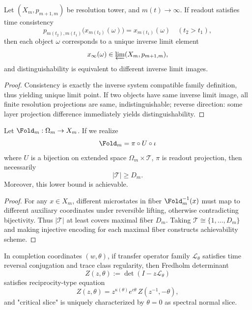 \begin{theorem}\label{thm:xi-time-consistent-inverse-limit-readout}
Let \((X_m,p_{m+1,m})\) be resolution tower, and \(m(t)\to\infty\).
If readout satisfies time consistency
\[
p_{m(t_2),m(t_1)}\bigl(x_{m(t_2)}(\omega)\bigr)=x_{m(t_1)}(\omega)\quad(t_2>t_1),
\]
then each object \(\omega\) corresponds to a unique inverse limit element
\[
x_\infty(\omega)\in \varprojlim(X_m,p_{m+1,m}),
\]
and distinguishability is equivalent to different inverse limit images.
\end{theorem}

\begin{proof}
Consistency is exactly the inverse system compatible family definition, thus yielding unique limit point.
If two objects have same inverse limit image, all finite resolution projections are same, indistinguishable;
reverse direction: some layer projection difference immediately yields distinguishability.
\end{proof}

\begin{theorem}\label{thm:xi-time-fiber-minimal-dimension}
Let \(\Fold_m:\Omega_m\to X_m\).
If we realize
\[
\Fold_m=\pi\circ U\circ\iota
\]
where \(U\) is a bijection on extended space \(\Omega_m\times\mathcal T\), \(\pi\) is readout projection, then necessarily
\[
|\mathcal T|\ge D_m.
\]
Moreover, this lower bound is achievable.
\end{theorem}

\begin{proof}
For any \(x\in X_m\), different microstates in fiber \(\Fold_m^{-1}(x)\) must map to different auxiliary coordinates under reversible lifting, otherwise contradicting bijectivity.
Thus \(|\mathcal T|\) at least covers maximal fiber \(D_m\).
Taking \(\mathcal T\cong\{1,\dots,D_m\}\) and making injective encoding for each maximal fiber constructs achievability scheme.
\end{proof}

\begin{proposition}\label{prop:xi-time-reversal-spectral-reciprocity}
In completion coordinates \((w,\theta)\), if transfer operator family \(\mathcal L_\theta\) satisfies time reversal conjugation and trace class regularity, then Fredholm determinant
\[
Z(z,\theta):=\det(I-z\mathcal L_\theta)
\]
satisfies reciprocity-type equation
\[
Z(z,\theta)=z^{\kappa(\theta)}e^{c\theta}\,Z(z^{-1},-\theta),
\]
and "critical slice" is uniquely characterized by \(\theta=0\) as spectral normal slice.
\end{proposition}

